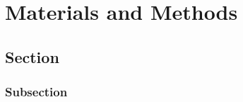 \chapter{Materials and Methods}

\section{Section}

\lipsum[3]

\subsection{Subsection}
 
\lipsum[4]